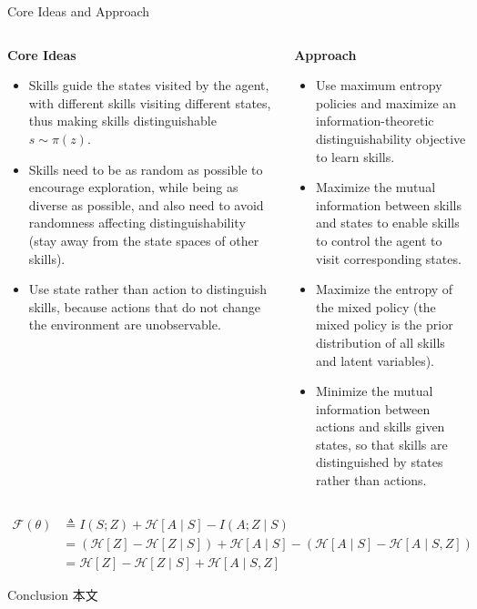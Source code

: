 \documentclass{beamer}
\begin{document}
\begin{frame}{Core Ideas and Approach}
	\tiny
    \begin{columns}
        \begin{column}{0.5\textwidth}
            \textbf{Core Ideas}
            \begin{itemize}
                \item Skills guide the states visited by the agent, with different skills visiting different states, thus making skills distinguishable \(s \sim \pi(z)\).
                \vspace{0.2cm}
                \item Skills need to be as random as possible to encourage exploration, while being as diverse as possible, and also need to avoid randomness affecting distinguishability (stay away from the state spaces of other skills).
                \vspace{0.2cm}
                \item Use state rather than action to distinguish skills, because actions that do not change the environment are unobservable.
            \end{itemize}
        \end{column}
        \begin{column}{0.5\textwidth}
            \textbf{Approach}
            \begin{itemize}
                \item Use maximum entropy policies and maximize an information-theoretic distinguishability objective to learn skills.

                    \item Maximize the mutual information between skills and states to enable skills to control the agent to visit corresponding states.
                    \item Maximize the entropy of the mixed policy (the mixed policy is the prior distribution of all skills and latent variables).
                    \item Minimize the mutual information between actions and skills given states, so that skills are distinguished by states rather than actions.
            \end{itemize}
        \end{column}
    \end{columns}
    
    \vspace{1cm}
    
    \[
\begin{aligned}
\mathcal{F}(\theta) &\triangleq I(S; Z) + \mathcal{H}[A \mid S] - I(A; Z \mid S) \\
&= (\mathcal{H}[Z] - \mathcal{H}[Z \mid S]) + \mathcal{H}[A \mid S] - (\mathcal{H}[A \mid S] - \mathcal{H}[A \mid S, Z]) \\
&= \mathcal{H}[Z] - \mathcal{H}[Z \mid S] + \mathcal{H}[A \mid S, Z]
\end{aligned}
\]
\end{frame}

\begin{frame}{Conclusion}
本文
\end{frame}
\end{document}
